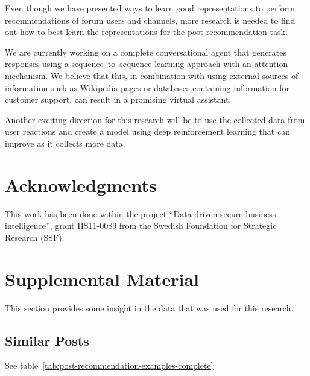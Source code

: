 \documentclass[11pt]{article}
\begin{document}
Even though we have presented ways to learn good representations to perform recommendations of forum users and channels, more research is needed to find out how to best learn the representations for the post recommendation task.

We are currently working on a complete conversational agent that generates responses using a sequence--to--sequence learning approach with an attention mechanism. We believe that this, in combination with using external sources of information such as Wikipedia pages or databases containing information for customer support, can result in a promising virtual assistant.

Another exciting direction for this research will be to use the collected data from user reactions and create a model using deep reinforcement learning that can improve as it collects more data.


\section*{Acknowledgments}


This work has been done within the project ``Data-driven secure business intelligence'', grant IIS11-0089 from the Swedish Foundation for Strategic Research (SSF).


%
%



\clearpage

\appendix

\iffalse
\section{Supplemental Material}
\label{sec:supplemental}

This section provides some insight in the data that was used for this research.

\subsection{Similar Posts}
\label{appendix:similar-posts}
See table~\ref{tab:post-recommendation-examples-complete}
\end{document}
